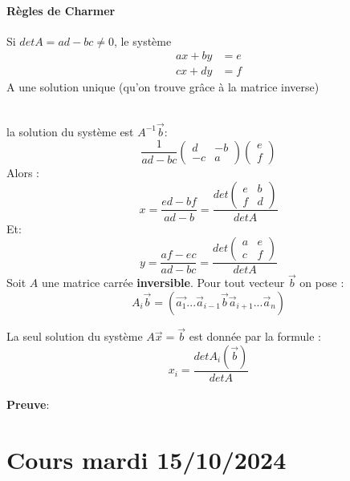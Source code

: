 \documentclass[11pt]{book}
\begin{document}
    \paragraph{Règles de Charmer}
    \begin{theoreme}
        
    
    Si $det A = ad-bc \neq 0$, le système
    \begin{align*}
        ax + by &= e\\
        cx + dy &= f
    \end{align*}
    A une solution unique (qu'on trouve grâce à la matrice inverse)
    \end{theoreme}
    \\
    
la solution du système est $A^{-1}\vec{b}$: 
\[\frac{1}{ad -bc}\begin{pmatrix}
    d & -b \\
    -c & a
\end{pmatrix}
\begin{pmatrix}
    e \\
    f
\end{pmatrix}\]
Alors : 
\[x = \frac{ed -bf}{ad -b} =  \frac{det\begin{pmatrix}
    e & b \\
    f & d
\end{pmatrix}} {det A}\]
Et:
\[
y = \frac{af - ec}{ad - bc} = \frac{det \begin{pmatrix}
    a & e \\
    c & f
\end{pmatrix}}{det A}
\]
Soit $A$ une matrice carrée \textbf{inversible}. Pour tout vecteur $\vec{b}$ on pose :
\[A_i\vec{b} = (\vec{a_1}... \vec{a}_{i-1} \vec{b} \vec{a}_{i+ 1} ... \vec{a}_n)\]

    La seul solution du système $A\vec{x} = \vec{b}$ est donnée par la formule : 
    \[
    x_i = \frac{detA_i(\vec{b})}{det A}
    \]
\\
\textbf{Preuve}:
\\

\section{Cours mardi 15/10/2024 }
\end{document}
